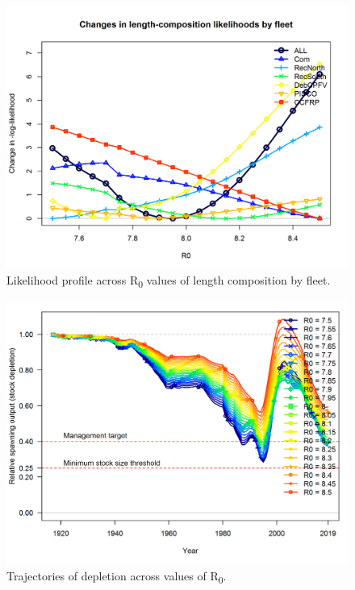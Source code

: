 \documentclass[12pt,]{article}
\begin{document}
\begin{figure}
\centering
\includegraphics{Figures/profile_R0_piner.png}
\caption{Likelihood profile across R\textsubscript{0} values of length
composition by fleet. \label{fig:profile_R0_piner}}
\end{figure}

\begin{figure}
\centering
\includegraphics{Figures/profile_R0_depl.png}
\caption{Trajectories of depletion across values of R\textsubscript{0}.
\label{fig:profile_R0_depl}}
\end{figure}

\FloatBarrier
\end{document}
